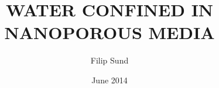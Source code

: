 \documentclass[twoside,english]{uiofysmaster}
\author{Filip Sund}
\title{\uppercase{Water confined in nanoporous media}}
\date{June 2014}
\begin{document}
\begin{titlepage}
\maketitle
\end{titlepage}
\end{document}

